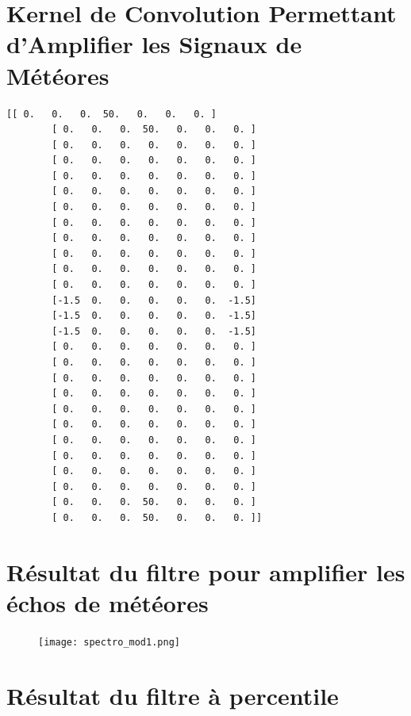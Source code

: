 \documentclass[11pt]{article}
\begin{document}
\newpage

\section{Kernel de Convolution Permettant d'Amplifier les Signaux de Météores} \label{app:kernel}

\begin{lstlisting}[style=CStyle]
       [[ 0.   0.   0.  50.   0.   0.   0. ]
        [ 0.   0.   0.  50.   0.   0.   0. ]
        [ 0.   0.   0.   0.   0.   0.   0. ]
        [ 0.   0.   0.   0.   0.   0.   0. ]
        [ 0.   0.   0.   0.   0.   0.   0. ]
        [ 0.   0.   0.   0.   0.   0.   0. ]
        [ 0.   0.   0.   0.   0.   0.   0. ]
        [ 0.   0.   0.   0.   0.   0.   0. ]
        [ 0.   0.   0.   0.   0.   0.   0. ]
        [ 0.   0.   0.   0.   0.   0.   0. ]
        [ 0.   0.   0.   0.   0.   0.   0. ]
        [ 0.   0.   0.   0.   0.   0.   0. ]
        [-1.5  0.   0.   0.   0.   0.  -1.5]
        [-1.5  0.   0.   0.   0.   0.  -1.5]
        [-1.5  0.   0.   0.   0.   0.  -1.5]
        [ 0.   0.   0.   0.   0.   0.   0. ]
        [ 0.   0.   0.   0.   0.   0.   0. ]
        [ 0.   0.   0.   0.   0.   0.   0. ]
        [ 0.   0.   0.   0.   0.   0.   0. ]
        [ 0.   0.   0.   0.   0.   0.   0. ]
        [ 0.   0.   0.   0.   0.   0.   0. ]
        [ 0.   0.   0.   0.   0.   0.   0. ]
        [ 0.   0.   0.   0.   0.   0.   0. ]
        [ 0.   0.   0.   0.   0.   0.   0. ]
        [ 0.   0.   0.   0.   0.   0.   0. ]
        [ 0.   0.   0.  50.   0.   0.   0. ]
        [ 0.   0.   0.  50.   0.   0.   0. ]]
\end{lstlisting}

\newpage

\section{Résultat du filtre pour amplifier les échos de météores} \label{app:spectro-mod1}

\begin{figure}[h]
    \begin{center}
        \texttt{[image: spectro\_mod1.png]}
    \end{center}
\end{figure}

\section{Résultat du filtre à percentile} \label{app:spectro-mod2}
\end{document}
